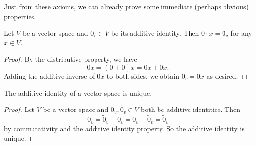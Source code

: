 Just from these axioms, we can already prove some
immediate (perhaps obvious) properties.

\begin{tcolorbox}
  \begin{prop}
    Let $V$ be a vector space and $0_v \in V$ be
    its additive identity. Then
    $0 \cdot x = 0_v$ for any $x \in V$.
  \end{prop}
\end{tcolorbox}

\begin{proof}
  By the distributive property, we have
  \[
    0 x = (0 + 0) x = 0 x + 0 x.
  \]
  Adding the additive inverse of $0 x$ to both sides,
  we obtain $0_v = 0x$ as desired.
\end{proof}

\begin{tcolorbox}
  \begin{prop}
    The additive identity of a vector space is unique.
  \end{prop}
\end{tcolorbox}

\begin{proof}
  Let $V$ be a vector space and $0_v, \widetilde{0}_v \in V$
  both be additive identities. Then
  \[
    0_v = \widetilde{0}_v + 0_v = 0_v + \widetilde{0}_v = \widetilde{0}_v
  \]
  by commutativity and the additive identity property.
  So the additive identity is unique.
\end{proof}
